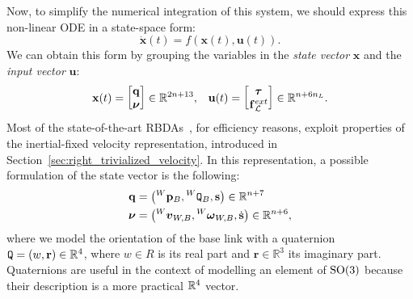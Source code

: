 Now, to simplify the numerical integration of this system, we should express this non-linear \ac{ODE} in a state-space form:
%
\begin{equation*}
    \dot{\mathbf{x}}(t) = f\left(\mathbf{x}(t), \mathbf{u}(t)\right) .
\end{equation*}
%
We can obtain this form by grouping the variables in the \emph{state vector} $\mathbf{x}$ and the \emph{input vector} $\mathbf{u}$:
%
\begin{align*}
    \mathbf{x}(t) =
    \begin{bmatrix}
        \mathbf{q} \\ \boldsymbol{\nu}
    \end{bmatrix}
    \in \mathbb{R}^{2n+13},
    &&
    \mathbf{u}(t) =
    \begin{bmatrix}
        \boldsymbol{\tau} \\ \forcesix^{ext}_\mathcal{L} 
    \end{bmatrix}
    \in \mathbb{R}^{n+6n_L}.
\end{align*}
%
Most of the state-of-the-art \aclp{RBDA}~\parencite{featherstone_rigid_2008}, for efficiency reasons, exploit properties of the inertial-fixed velocity representation, introduced in Section~\ref{sec:right_trivialized_velocity}.
In this representation, a possible formulation of the state vector is the following:
%
\begin{align*}
    \mathbf{q} &= \left( \pos[W]_B,  \quat[W]_B, \mathbf{s} \right) \in \mathbb{R}^{n+7} \\
    \boldsymbol{\nu} &= \left( \vellin[W]_{W,B}, \velang[W]_{W,B}, \dot{\mathbf{s}} \right) \in \mathbb{R}^{n+6}
    ,
\end{align*}
%
where we model the orientation of the base link with a quaternion $\quat = (w, \mathbf{r}) \in \mathbb{R}^4$, where $w \in R$ is its real part and $\mathbf{r} \in \mathbb{R}^3$ its imaginary part.
Quaternions are useful in the context of modelling an element of $\SO(3)$ because their description is a more practical $\realn^4$ vector.

